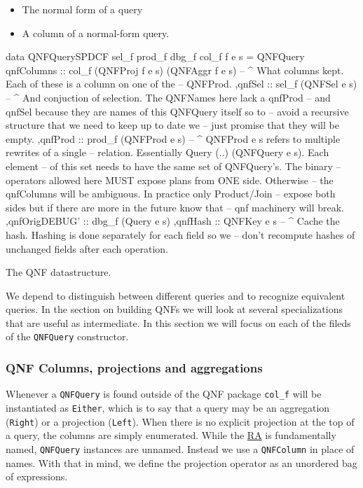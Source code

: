 \begin{itemize}
\item The normal form of a query
\item A column of a normal-form query.
\end{itemize}

\begin{listing}[p]
  \begin{haskell}
    data QNFQuerySPDCF sel_f prod_f dbg_f col_f f e s =
    QNFQuery
    { qnfColumns :: col_f (QNFProj f e s) (QNFAggr f e s)
      -- ^ What columns kept. Each of these is a column on one of the
      -- QNFProd.
      ,qnfSel :: sel_f (QNFSel e s)
      -- ^ And conjuction of selection. The QNFNames here lack a qnfProd
      -- and qnfSel because they are names of this QNFQuery itself so to
      -- avoid a recursive structure that we need to keep up to date we
      -- just promise that they will be empty.
      ,qnfProd :: prod_f (QNFProd e s)
      -- ^ QNFProd e s refers to multiple rewrites of a single
      -- relation. Essentially {Query (..) (QNFQuery e s)}. Each element
      -- of this set needs to have the same set of QNFQuery's. The binary
      -- operators allowed here MUST expose plans from ONE side. Otherwise
      -- the qnfColumns will be ambiguous. In practice only Product/Join
      -- expose both sides but if there are more in the future know that
      -- qnf machinery will break.
      ,qnfOrigDEBUG' :: dbg_f (Query e s)
      ,qnfHash :: QNFKey e s
      -- ^ Cache the hash. Hashing is done separately for each field so we
      -- don't recompute hashes of unchanged fields after each operation.
    }
  \end{haskell}
  \caption{\label{org4e7446e}The QNF datastructure.}
\end{listing}


We depend to distinguish between different queries and to recognize
equivalent queries. In the section on building QNFs we will look at
several specializations that are useful as intermediate. In this
section we will focus on each of the fileds of the \texttt{QNFQuery}
constructor.
\subsubsection{QNF Columns, projections and aggregations}
\label{sec:orgba02a81}
Whenever a \texttt{QNFQuery} is found outside of the QNF package \texttt{col\_f} will
be instantiated as \texttt{Either}, which is to say that a query may be an
aggregation (\texttt{Right}) or a projection (\texttt{Left}). When there is no
explicit projection at the top of a query, the columns are simply
enumerated. While the \hyperref[sec:relational_algebra_semantics]{RA} is fundamentally named, \texttt{QNFQuery} instances
are unnamed. Instead we use a \texttt{QNFColumn} in place of names. With that
in mind, we define the projection operator as an unordered bag of
expressions.

